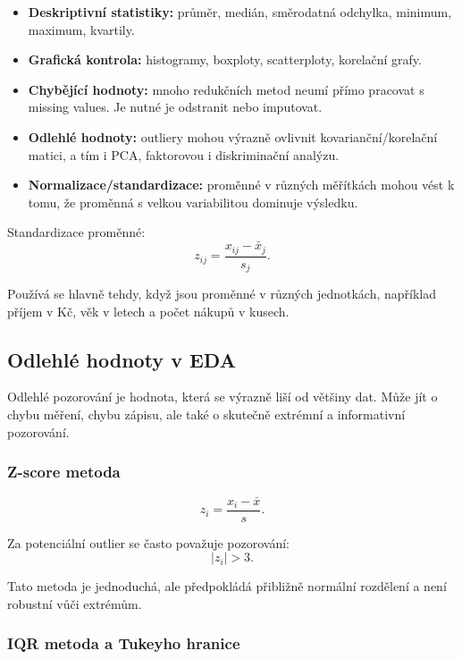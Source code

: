\begin{itemize}
    \item \textbf{Deskriptivní statistiky:} průměr, medián, směrodatná odchylka, minimum, maximum,
    kvartily.
    
    \item \textbf{Grafická kontrola:} histogramy, boxploty, scatterploty, korelační grafy.
    
    \item \textbf{Chybějící hodnoty:} mnoho redukčních metod neumí přímo pracovat s missing values.
    Je nutné je odstranit nebo imputovat.
    
    \item \textbf{Odlehlé hodnoty:} outliery mohou výrazně ovlivnit kovarianční/korelační matici,
    a tím i PCA, faktorovou i diskriminační analýzu.
    
    \item \textbf{Normalizace/standardizace:} proměnné v různých měřítkách mohou vést k tomu, že
    proměnná s velkou variabilitou dominuje výsledku.
\end{itemize}

Standardizace proměnné:
\[
z_{ij}
=
\frac{x_{ij}-\bar{x}_j}{s_j}.
\]

Používá se hlavně tehdy, když jsou proměnné v různých jednotkách, například příjem v Kč,
věk v letech a počet nákupů v kusech.

\subsection{Odlehlé hodnoty v EDA}

Odlehlé pozorování je hodnota, která se výrazně liší od většiny dat. Může jít o chybu měření,
chybu zápisu, ale také o skutečně extrémní a informativní pozorování.

\subsubsection{Z-score metoda}

\[
z_i = \frac{x_i-\bar{x}}{s}.
\]

Za potenciální outlier se často považuje pozorování:
\[
|z_i|>3.
\]

Tato metoda je jednoduchá, ale předpokládá přibližně normální rozdělení a není robustní vůči extrémům.

\subsubsection{IQR metoda a Tukeyho hranice}

